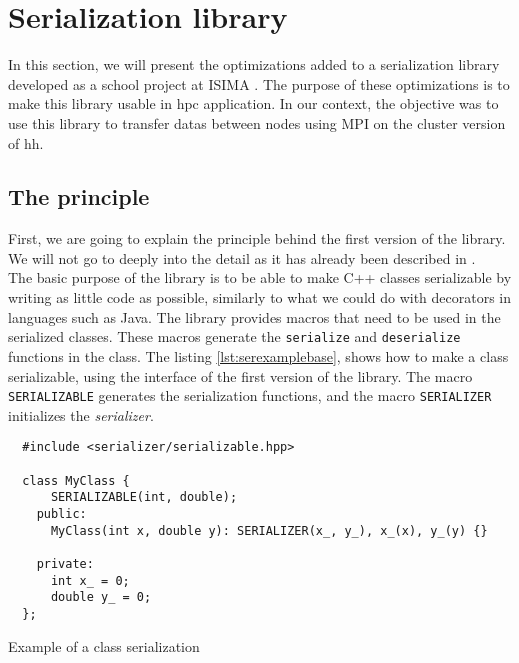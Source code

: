 
\clearpage{}
\section{Serialization library}

In this section, we will present the optimizations added to a serialization
library developed as a school project at ISIMA \cite{projectzz3isima}. The
purpose of these optimizations is to make this library usable in \gls{hpc}
application. In our context, the objective was to use this library to transfer
datas between nodes using MPI on the cluster version of \gls{hh}.

\subsection{The principle}

First, we are going to explain the principle behind the first version of the
library. We will not go to deeply into the detail as it has already been
described in \cite{projectzz3isima}.\\

The basic purpose of the library is to be able to make C++ classes serializable
by writing as little code as possible, similarly to what we could do with
decorators in languages such as Java. The library provides macros that need to
be used in the serialized classes. These macros generate the \texttt{serialize}
and \texttt{deserialize} functions in the class. The listing
\ref{lst:serexamplebase}, shows how to make a class serializable, using the
interface of the first version of the library. The macro \texttt{SERIALIZABLE}
generates the serialization functions, and the macro \texttt{SERIALIZER}
initializes the \textit{serializer}.

\begin{listing}[ht!]
\begin{verbatim}
  #include <serializer/serializable.hpp>

  class MyClass {
      SERIALIZABLE(int, double);
    public:
      MyClass(int x, double y): SERIALIZER(x_, y_), x_(x), y_(y) {}

    private:
      int x_ = 0;
      double y_ = 0;
  };
\end{verbatim}
\caption{Example of a class serialization}
\label{lst:serexamplebase}
\end{listing}

